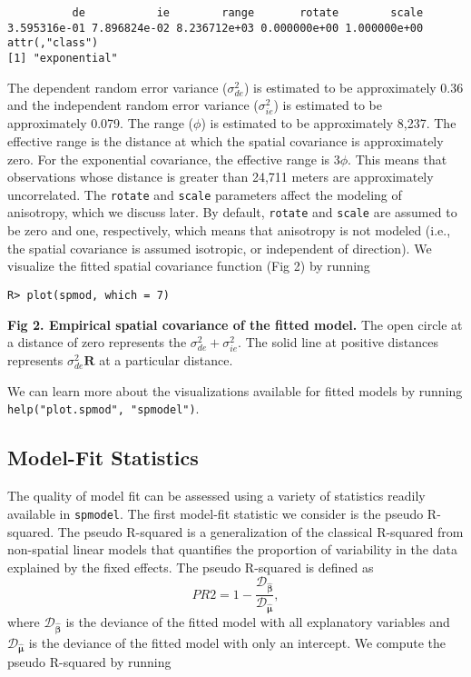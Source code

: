 \documentclass[10pt,letterpaper]{article}
\begin{document}
\begin{verbatim}
          de           ie        range       rotate        scale 
3.595316e-01 7.896824e-02 8.236712e+03 0.000000e+00 1.000000e+00 
attr(,"class")
[1] "exponential"
\end{verbatim}

The dependent random error variance (\(\sigma^2_{de}\)) is estimated to
be approximately 0.36 and the independent random error variance
(\(\sigma^2_{ie}\)) is estimated to be approximately 0.079. The range
(\(\phi\)) is estimated to be approximately 8,237. The effective range
is the distance at which the spatial covariance is approximately zero.
For the exponential covariance, the effective range is \(3\phi\). This
means that observations whose distance is greater than 24,711 meters are
approximately uncorrelated. The \texttt{rotate} and \texttt{scale}
parameters affect the modeling of anisotropy, which we discuss later. By
default, \texttt{rotate} and \texttt{scale} are assumed to be zero and
one, respectively, which means that anisotropy is not modeled (i.e., the
spatial covariance is assumed isotropic, or independent of direction).
We visualize the fitted spatial covariance function (Fig 2) by running

\begin{verbatim}
R> plot(spmod, which = 7)
\end{verbatim}

\textbf{Fig 2. Empirical spatial covariance of the fitted model.} The
open circle at a distance of zero represents the
\(\sigma^2_{de} + \sigma^2_{ie}\). The solid line at positive distances
represents \(\sigma^2_{de} \mathbf{R}\) at a particular distance.

We can learn more about the visualizations available for fitted models
by running \texttt{help("plot.spmod",\ "spmodel")}.

\hypertarget{model-fit-statistics}{%
\subsection{Model-Fit Statistics}\label{model-fit-statistics}}

The quality of model fit can be assessed using a variety of statistics
readily available in \texttt{spmodel}. The first model-fit statistic we
consider is the pseudo R-squared. The pseudo R-squared is a
generalization of the classical R-squared from non-spatial linear models
that quantifies the proportion of variability in the data explained by
the fixed effects. The pseudo R-squared is defined as \begin{equation*}
PR2 = 1 - \frac{\mathcal{D}_{\boldsymbol{\hat{\beta}}}}{\mathcal{D}_{\boldsymbol{\hat{\mu}}}},
\end{equation*} where \(\mathcal{D}_{\boldsymbol{\hat{\beta}}}\) is the
deviance of the fitted model with all explanatory variables and
\(\mathcal{D}_{\boldsymbol{\hat{\mu}}}\) is the deviance of the fitted
model with only an intercept. We compute the pseudo R-squared by running
\end{document}
